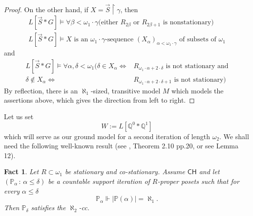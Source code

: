 \documentclass[a4paper,12pt]{article}
\newtheorem{fact}[theorem]{Fact}
\newcommand{\forceP}{\mathbb{P}}
\newcommand{\forceQ}{\mathbb{Q}}
\newcommand{\CH}{\mathsf{CH}}
\begin{document}
\begin{proof}
On the other hand, if $X=\vec{S} \upharpoonright \gamma$, then
\begin{align*}
L[\vec{S} \ast G] \models \forall \beta< \omega_1 \cdot \gamma (\text{either  $R_{2\beta}$ or $R_{2\beta+1}$ is nonstationary) } \\ 
L[\vec{S} \ast G]  \models X \text{ is an $\omega_1 \cdot \gamma$-sequence $(X_{\alpha})_{\alpha < \omega_1 \cdot \gamma}$ of subsets of $\omega_1$}
\end{align*}
and
\begin{align*}
L[\vec{S} \ast G] \models  \forall \alpha, \delta < \omega_1 (\delta  \in X_{\alpha} \Leftrightarrow & R_{\omega_1 \cdot \alpha + 2 \cdot \delta } \text{ is not stationary and} \\ 
\delta  \notin X_{\alpha} \Leftrightarrow&  R_{\omega_1 \cdot \alpha + 2 \cdot \delta +1} \text{ is not stationary})
\end{align*}
By reflection, there is an $\aleph_1$-sized, transitive model $M$ which models the assertions above, which gives the direction from left to right.

\end{proof}


Let us set \[W:= L[\forceQ^0\ast \forceQ^1 ]\] which will serve as our ground model for a second iteration of length $\omega_2$. We shall need the following
well-known result (see \cite{Abraham}, Theorem 2.10 pp.20, or see \cite{SyVera} Lemma 12).
\begin{fact}
Let $R\subset \omega_1$ be stationary and co-stationary.
Assume $\CH$ and let $(\forceP_{\alpha} \, : \, \alpha \le \delta)$ be a
countable support iteration of $R$-proper posets such
that for every $\alpha \le \delta$
\[ \forceP_{\alpha} \Vdash |\forceP(\alpha)| = \aleph_1. \]
Then $\forceP_{\delta}$ satisfies the $\aleph_2$-cc.
\end{fact}
\end{document}
